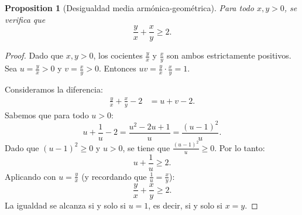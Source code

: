 \documentclass[11pt,a4paper]{article}
\theoremstyle{plain}
\newtheorem{proposition}[theorem]{Proposition}
\theoremstyle{definition}
\begin{document}
\bigskip

\begin{proposition}[Desigualdad media armónica-geométrica]
Para todo $x, y > 0$, se verifica que
\[
\frac{y}{x} + \frac{x}{y} \geq 2.
\]
\end{proposition}

\begin{proof}
Dado que $x, y > 0$, los cocientes $\frac{y}{x}$ y $\frac{x}{y}$ son ambos estrictamente positivos. Sea $u = \frac{y}{x} > 0$ y $v = \frac{x}{y} > 0$. Entonces $uv = \frac{y}{x} \cdot \frac{x}{y} = 1$.

Consideramos la diferencia:
\begin{align*}
\frac{y}{x} + \frac{x}{y} - 2 &= u + v - 2.
\end{align*}
Sabemos que para todo $u > 0$:
\[
u + \frac{1}{u} - 2 = \frac{u^2 - 2u + 1}{u} = \frac{(u - 1)^2}{u}.
\]
Dado que $(u-1)^2 \geq 0$ y $u > 0$, se tiene que $\frac{(u-1)^2}{u} \geq 0$. Por lo tanto:
\[
u + \frac{1}{u} \geq 2.
\]
Aplicando con $u = \frac{y}{x}$ (y recordando que $\frac{1}{u} = \frac{x}{y}$):
\[
\frac{y}{x} + \frac{x}{y} \geq 2.
\]
La igualdad se alcanza si y solo si $u = 1$, es decir, si y solo si $x = y$.
\end{proof}
\end{document}
